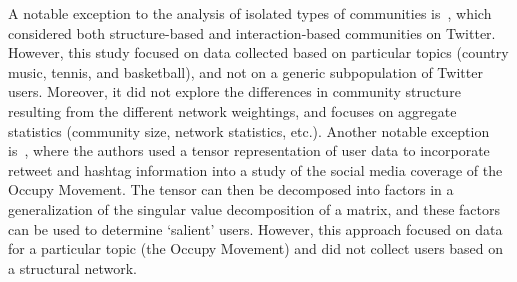 










A notable exception to the analysis of isolated types of communities is~\cite{lim2012tweets}, which considered both structure-based and interaction-based communities on Twitter. However, this study focused on data collected based on particular topics (country music, tennis, and basketball), and not on a generic subpopulation of Twitter users. Moreover, it did not explore the differences in community structure resulting from the different network weightings, and focuses on aggregate statistics (community size, network statistics, etc.). Another notable exception is~\cite{kao2013talison}, where the authors used a tensor representation of user data to incorporate retweet and hashtag information into a study of the social media coverage of the Occupy Movement. The tensor can then be decomposed into factors in a generalization of the singular value decomposition of a matrix, and these factors can be used to determine `salient' users. However, this approach focused on data for a particular topic (the Occupy Movement) and did not collect users based on a structural network.